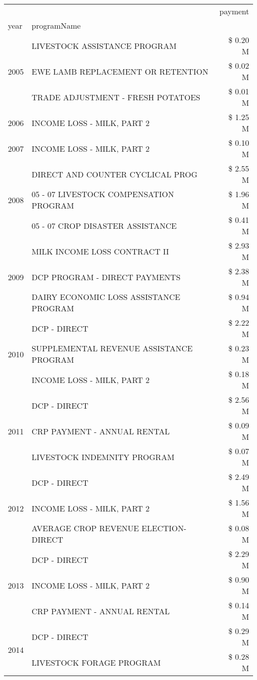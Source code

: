 \begin{tabular}{llr}
\toprule
 &  & payment \\
year & programName &  \\
\midrule
\multirow[t]{3}{*}{2005} & LIVESTOCK ASSISTANCE PROGRAM & \$ 0.20 M \\
 & EWE LAMB REPLACEMENT OR RETENTION & \$ 0.02 M \\
 & TRADE ADJUSTMENT - FRESH POTATOES & \$ 0.01 M \\
\cline{1-3}
2006 & INCOME LOSS - MILK, PART 2 & \$ 1.25 M \\
\cline{1-3}
2007 & INCOME LOSS - MILK, PART 2 & \$ 0.10 M \\
\cline{1-3}
\multirow[t]{3}{*}{2008} & DIRECT AND COUNTER CYCLICAL PROG & \$ 2.55 M \\
 & 05 - 07 LIVESTOCK COMPENSATION PROGRAM & \$ 1.96 M \\
 & 05 - 07 CROP DISASTER ASSISTANCE & \$ 0.41 M \\
\cline{1-3}
\multirow[t]{3}{*}{2009} & MILK INCOME LOSS CONTRACT II & \$ 2.93 M \\
 & DCP PROGRAM - DIRECT PAYMENTS & \$ 2.38 M \\
 & DAIRY ECONOMIC LOSS ASSISTANCE PROGRAM & \$ 0.94 M \\
\cline{1-3}
\multirow[t]{3}{*}{2010} & DCP - DIRECT & \$ 2.22 M \\
 & SUPPLEMENTAL REVENUE ASSISTANCE PROGRAM & \$ 0.23 M \\
 & INCOME LOSS - MILK, PART 2 & \$ 0.18 M \\
\cline{1-3}
\multirow[t]{3}{*}{2011} & DCP - DIRECT & \$ 2.56 M \\
 & CRP PAYMENT - ANNUAL RENTAL & \$ 0.09 M \\
 & LIVESTOCK INDEMNITY PROGRAM & \$ 0.07 M \\
\cline{1-3}
\multirow[t]{3}{*}{2012} & DCP - DIRECT & \$ 2.49 M \\
 & INCOME LOSS - MILK, PART 2 & \$ 1.56 M \\
 & AVERAGE CROP REVENUE ELECTION-DIRECT & \$ 0.08 M \\
\cline{1-3}
\multirow[t]{3}{*}{2013} & DCP - DIRECT & \$ 2.29 M \\
 & INCOME LOSS - MILK, PART 2 & \$ 0.90 M \\
 & CRP PAYMENT - ANNUAL RENTAL & \$ 0.14 M \\
\cline{1-3}
\multirow[t]{3}{*}{2014} & DCP - DIRECT & \$ 0.29 M \\
 & LIVESTOCK FORAGE PROGRAM & \$ 0.28 M \\

\end{tabular}
